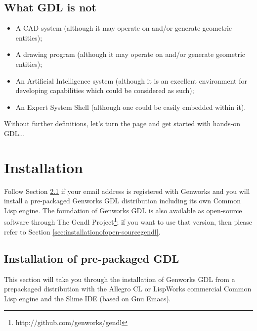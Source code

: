 \documentclass [11pt]{book}
\begin{document}
\section{What GDL is not}

\label{sec:whatgdlisnot}



\begin{itemize}

\item A CAD system (although it may operate on and/or generate geometric entities);

\item A drawing program (although it may operate on and/or generate geometric entities);

\item An Artificial Intelligence system (although it is an
excellent environment for developing capabilities which could be
considered as such);

\item An Expert System Shell (although one could be easily embedded within it).

\end{itemize}

Without further definitions, let's turn the page and get
      started with hands-on GDL...

\chapter{Installation}

\label{chap:installation}

Follow Section 
\ref{sec:installationofpre-packagedgdl} if your email address is registered with Genworks and you will
install a pre-packaged Genworks GDL distribution including its own
Common Lisp engine.  The foundation of Genworks GDL is also available
as open-source software through The Gendl Project\footnote{http://github.com/genworks/gendl}; if you want to use that version, then please refer to Section 
\ref{sec:installationofopen-sourcegendl}.

\section{Installation of pre-packaged GDL}

\label{sec:installationofpre-packagedgdl}

This section will take you through the installation of
Genworks GDL from a prepackaged distribution with the Allegro CL or
LispWorks commercial Common Lisp engine and the Slime IDE (based on
Gnu Emacs).
\end{document}
